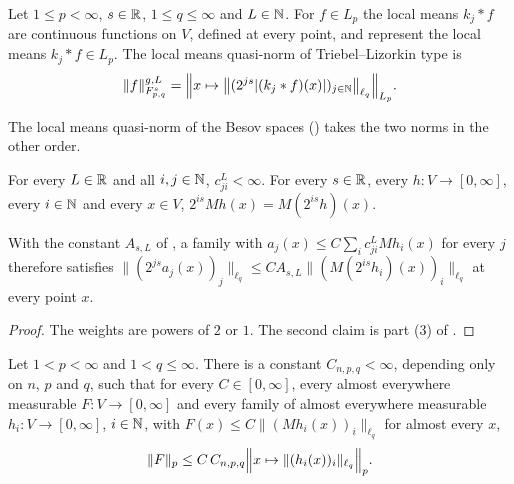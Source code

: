\begin{definition}
\label{def:tl-local-means}
\leanok
{}
Let $1 \leq p < \infty$, $s \in \mathbb{R}$, $1 \leq q \leq \infty$ and $L \in \mathbb{N}$. For $f \in L_p$ the
local means $k_j * f$ are continuous functions on $V$, defined at every point, and represent the
local means $k_j * f \in L_p$. The local means quasi-norm of Triebel--Lizorkin type is
\[
  \|f\|^{g,L}_{F^s_{p,q}} = \Bigl\| x \mapsto \bigl\| (2^{js} |(k_j * f)(x)|)_{j \in \mathbb{N}}
  \bigr\|_{\ell_q} \Bigr\|_{L_p} .
\]
\end{definition}

The local means quasi-norm of the Besov spaces () takes the two norms in
the other order.

\begin{lemma}
\label{lem:almost-diagonal-pointwise}
\leanok
{}
For every $L \in \mathbb{R}$ and all $i, j \in \mathbb{N}$, $c^L_{ji} < \infty$. For every $s \in \mathbb{R}$, every
$h : V \to [0, \infty]$, every $i \in \mathbb{N}$ and every $x \in V$,
$2^{is} M h(x) = M(2^{is} h)(x)$.
\end{lemma}

With the constant $A_{s,L}$ of , a family with
$a_j(x) \leq C \sum_i c^L_{ji} M h_i(x)$ for every $j$ therefore satisfies
$\|(2^{js} a_j(x))_j\|_{\ell_q} \leq C A_{s,L} \|(M(2^{is} h_i)(x))_i\|_{\ell_q}$ at every point
$x$.

\begin{proof}
\leanok
The weights are powers of $2$ or $1$. The second claim is part (3) of
.
\end{proof}

\begin{lemma}
\label{lem:maximal-bounds-mixed-norm}
\leanok
{}
Let $1 < p < \infty$ and $1 < q \leq \infty$. There is a constant $C_{n,p,q} < \infty$,
depending only on $n$, $p$ and $q$, such that for every $C \in [0, \infty]$, every almost
everywhere measurable $F : V \to [0, \infty]$ and every family of almost everywhere measurable
$h_i : V \to [0, \infty]$, $i \in \mathbb{N}$, with $F(x) \leq C \|(M h_i(x))_i\|_{\ell_q}$ for almost
every $x$,
\[
  \|F\|_p \leq C \, C_{n,p,q} \Bigl\| x \mapsto \|(h_i(x))_i\|_{\ell_q} \Bigr\|_p .
\]
\end{lemma}

